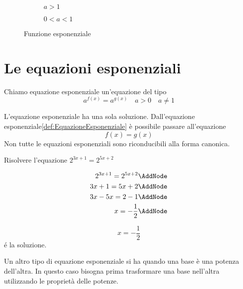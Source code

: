 \begin{figure}
	\centering
	\begin{subfigure}[b]{.4\linewidth}
		\centering
		
		\caption{$a>1$}
		\label{fig:funzioniEsempio6}
	\end{subfigure}\qquad
	\centering
	\begin{subfigure}[b]{.4\linewidth}
		\centering
		
		\caption{$0<a<1$}
		\label{fig:funzioniEsempio7}
	\end{subfigure}%
		\caption{Funzione esponenziale}
		\label{fig:funzExp2}
\end{figure}
\section{Le equazioni esponenziali}
\label{sec:LeEquazioniEsponenziali}
\begin{definizione}\label{def:EquazioneEsponenziale}
Chiamo equazione esponenziale un'equazione del tipo \[a^{f(x)}=a^{g(x)}\quad a>0\quad  a\neq1 \]
\end{definizione}
L'equazione esponenziale ha una sola soluzione. 
Dall'equazione esponenziale\nobs\vref{def:EquazioneEsponenziale} è possibile passare all'equazione \[f(x)=g(x) \]Non tutte le equazioni esponenziali sono riconducibili alla forma canonica.
\begin{esempio}
	Risolvere l'equazione $2^{3x+1}=2^{5x+2} $
\begin{NodesList}[margin=4cm]
\begin{align*}
2^{3x+1}=2^{5x+2}\AddNode\\
3x+1=5x+2\AddNode\\
3x-5x=2-1\AddNode\\
x=-\dfrac{1}{2}\AddNode
\end{align*}
%
%
%
\end{NodesList}
\[x=-\dfrac{1}{2}\]
\'{e} la soluzione.
\end{esempio}
Un altro tipo di equazione esponenziale si ha quando una base è una potenza dell'altra. In questo caso bisogna prima trasformare una base nell'altra utilizzando le proprietà delle potenze.
